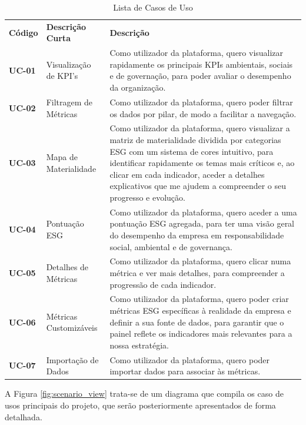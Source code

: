 \begin{table}[H]
    \renewcommand{\arraystretch}{1.2}
    \setlength{\tabcolsep}{10pt}
    \centering
    \begin{tabular}{>{\bfseries}p{1.5cm} p{3.5cm} p{8cm}}
        \rowcolor{orange!50}
        Código & \textbf{Descrição Curta} & \textbf{Descrição} \\
        UC-01 & Visualização de KPI's & Como utilizador da plataforma, quero visualizar rapidamente os principais KPIs ambientais, sociais e de governação, para poder avaliar o desempenho da organização. \\
        UC-02 & Filtragem de Métricas & Como utilizador da plataforma, quero poder filtrar os dados por pilar, de modo a facilitar a navegação. \\
        UC-03 & Mapa de Materialidade & Como utilizador da plataforma, quero visualizar a matriz de materialidade dividida por categorias ESG com um sistema de cores intuitivo, para identificar rapidamente os temas mais críticos e, ao clicar em cada indicador, aceder a detalhes explicativos que me ajudem a compreender o seu progresso e evolução. \\
        UC-04 & Pontuação ESG & Como utilizador da plataforma, quero aceder a uma pontuação ESG agregada, para ter uma visão geral do desempenho da empresa em responsabilidade social, ambiental e de governança. \\
        UC-05 & Detalhes de Métricas & Como utilizador da plataforma, quero clicar numa métrica e ver mais detalhes, para compreender a progressão de cada indicador. \\
        UC-06 & Métricas Customizáveis & Como utilizador da plataforma, quero poder criar métricas ESG específicas à realidade da empresa e definir a sua fonte de dados, para garantir que o painel reflete os indicadores mais relevantes para a nossa estratégia. \\
        UC-07 & Importação de Dados & Como utilizador da plataforma, quero poder importar dados para associar às métricas. \\      
    \end{tabular}
    \caption{Lista de Casos de Uso}
    \label{tab:use_cases}
\end{table}

A Figura \ref{fig:scenario_view} trata-se de um diagrama que compila os caso de usos principais do projeto, que serão posteriormente apresentados de forma detalhada.


